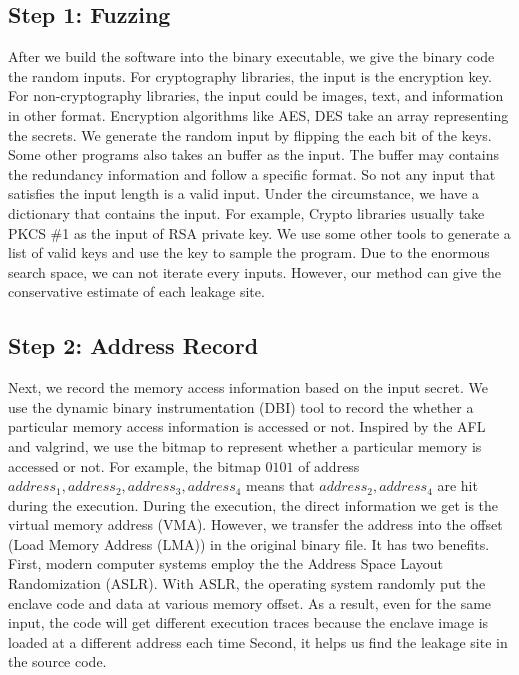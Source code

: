 \subsection{Step 1: Fuzzing}
After we build the software into the binary executable, we give the binary code the random inputs. For cryptography libraries, the input is the encryption key. For non-cryptography libraries, the input could be images, text, and information in other format. Encryption algorithms like AES, DES take an array representing the secrets. We generate the random input by flipping the each bit of the keys. Some other programs also takes an buffer as the input. The buffer may contains the redundancy information and follow a specific format. So not any input that satisfies the input length is a valid input. Under the circumstance, we have a dictionary that contains the input. For example, Crypto libraries usually take PKCS \#1 as the input of RSA private key. We use some other tools to generate a list of valid keys and use the key to sample the program. Due to the enormous search space, we can not iterate every inputs. However, our method can give the conservative  estimate of each leakage site.
\subsection{Step 2: Address Record}
Next, we record the memory access information based on the input secret. We use the dynamic binary instrumentation (DBI) tool to record the whether a particular memory access information is accessed or not. Inspired by the AFL and valgrind, we use the bitmap to represent whether a particular memory is accessed or not. For example, the bitmap ${0101}$ of address $address_1, address_2, address_3, address_4$ means that $address_2, address_4$ are hit during the execution. During the execution, the direct information we get is the virtual memory address (VMA). However, we transfer the address into the offset (Load Memory Address (LMA)) in the original binary file. It has two benefits. First, modern computer systems employ the the Address Space Layout Randomization (ASLR). With ASLR, the operating system randomly put the enclave code and data at various memory offset. As a result, even for the same input, the code will get different execution traces because the enclave image is loaded at a different address each time Second, it helps us find the leakage site in the source code.

